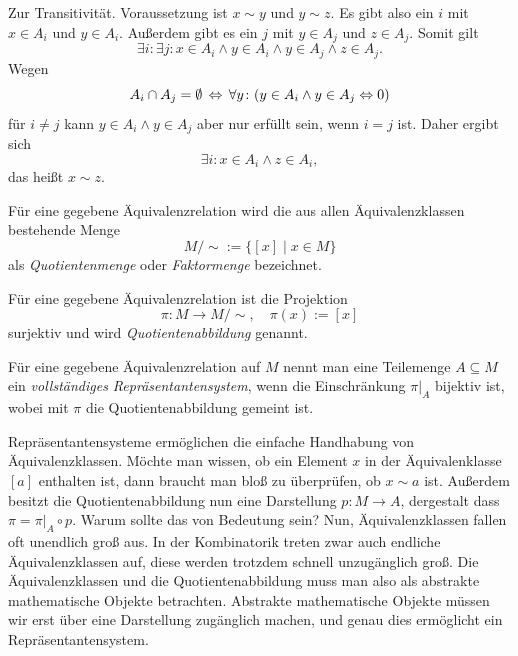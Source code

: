 Zur Transitivität. Voraussetzung ist $x\sim y$ und $y\sim z$.
Es gibt also ein $i$ mit $x\in A_i$ und $y\in A_i$. Außerdem gibt
es ein $j$ mit $y\in A_j$ und $z\in A_j$. Somit gilt%
\[\exists i\colon\exists j\colon x\in A_i\land y\in A_i\land y\in A_j\land z\in A_j.\]
Wegen
\[A_i\cap A_j = \emptyset\, \Leftrightarrow\, \forall y\colon (y\in A_i\land y\in A_j\Leftrightarrow 0)\]
für $i\ne j$ kann $y\in A_i\land y\in A_j$ aber nur erfüllt sein,
wenn $i=j$ ist. Daher ergibt sich%
\[\exists i\colon x\in A_i\land z\in A_i,\]
das heißt $x\sim z$.\;\qedsymbol

\begin{Definition}[Quotientenmenge]%
\newlinefirst
Für eine gegebene Äquivalenzrelation wird die aus allen
Äquivalenzklassen bestehende Menge
\[M/{\sim} := \{[x]\mid x\in M\}\]
als \emph{Quotientenmenge} oder \emph{Faktormenge} bezeichnet.
\end{Definition}

\begin{Definition}[Quotientenabbildung]%
\newlinefirst
Für eine gegebene Äquivalenzrelation ist die Projektion
\[\pi\colon M\to M/{\sim},\quad \pi(x):=[x]\]
surjektiv und wird \emph{Quotientenabbildung} genannt.
\end{Definition}

\begin{Definition}[Repräsentantensystem]%
\newlinefirst
Für eine gegebene Äquivalenzrelation auf $M$ nennt man eine
Teilemenge $A\subseteq M$ ein \emph{vollständiges Repräsentantensystem},
wenn die Einschränkung $\pi|_A$ bijektiv ist, wobei mit $\pi$
die Quotientenabbildung gemeint ist.
\end{Definition}
Repräsentantensysteme ermöglichen die einfache Handhabung von
Äquivalenzklassen. Möchte man wissen, ob ein Element $x$ in der
Äquivalenklasse $[a]$ enthalten ist, dann braucht man bloß
zu überprüfen, ob $x\sim a$ ist. Außerdem besitzt die
Quotientenabbildung nun eine Darstellung $p\colon M\to A$,
dergestalt dass $\pi = \pi|_{A}\circ p$. Warum sollte das von
Bedeutung sein? Nun, Äquivalenzklassen fallen oft unendlich groß
aus. In der Kombinatorik treten zwar auch endliche Äquivalenzklassen auf,
diese werden trotzdem schnell unzugänglich groß. Die Äquivalenzklassen
und die Quotientenabbildung muss man also als abstrakte mathematische
Objekte betrachten. Abstrakte mathematische Objekte müssen wir erst
über eine Darstellung zugänglich machen, und genau dies ermöglicht
ein Repräsentantensystem.


